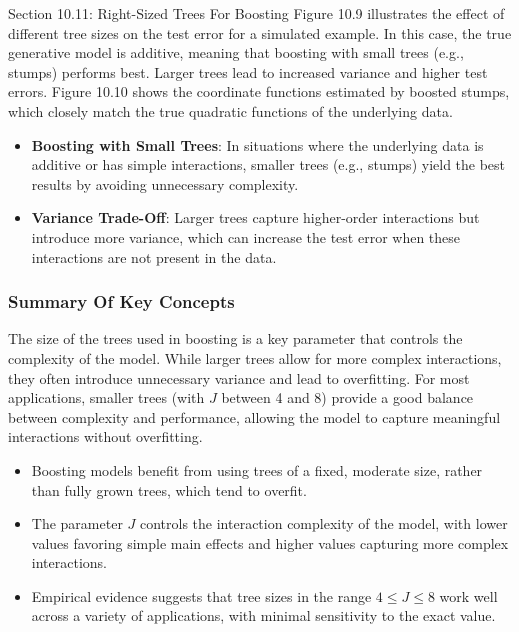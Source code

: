 \begin{notes}{Section 10.11: Right-Sized Trees For Boosting}
    Figure 10.9 illustrates the effect of different tree sizes on the test error for a simulated example. In this case, the true generative model is additive, meaning that boosting with small trees 
    (e.g., stumps) performs best. Larger trees lead to increased variance and higher test errors. Figure 10.10 shows the coordinate functions estimated by boosted stumps, which closely match the true 
    quadratic functions of the underlying data.
    
    \begin{highlight}
        \begin{itemize}
            \item \textbf{Boosting with Small Trees}: In situations where the underlying data is additive or has simple interactions, smaller trees (e.g., stumps) yield the best results by avoiding unnecessary complexity.
            \item \textbf{Variance Trade-Off}: Larger trees capture higher-order interactions but introduce more variance, which can increase the test error when these interactions are not present in the data.
        \end{itemize}
    \end{highlight}
    
    \subsubsection*{Summary Of Key Concepts}
    
    The size of the trees used in boosting is a key parameter that controls the complexity of the model. While larger trees allow for more complex interactions, they often introduce unnecessary variance 
    and lead to overfitting. For most applications, smaller trees (with $J$ between 4 and 8) provide a good balance between complexity and performance, allowing the model to capture meaningful interactions 
    without overfitting.
    
    \begin{highlight}
        \begin{itemize}
            \item Boosting models benefit from using trees of a fixed, moderate size, rather than fully grown trees, which tend to overfit.
            \item The parameter $J$ controls the interaction complexity of the model, with lower values favoring simple main effects and higher values capturing more complex interactions.
            \item Empirical evidence suggests that tree sizes in the range $4 \leq J \leq 8$ work well across a variety of applications, with minimal sensitivity to the exact value.
        \end{itemize}
    \end{highlight}
\end{notes}